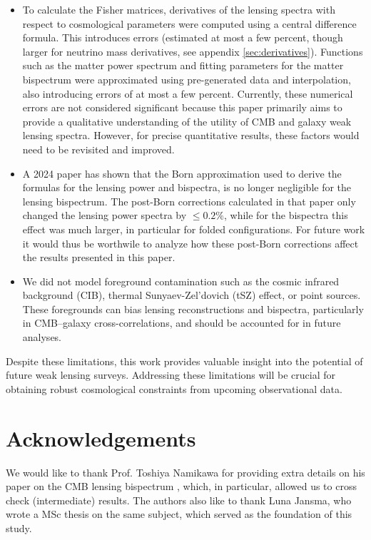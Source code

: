 \documentclass[11pt]{article} %
\begin{document}
\begin{itemize}
    \item To calculate the Fisher matrices, derivatives of the lensing spectra with respect to cosmological parameters were computed using a central difference formula.  This introduces errors (estimated at most a few percent, though larger for neutrino mass derivatives, see appendix \ref{sec:derivatives}). Functions such as the matter power spectrum and fitting parameters for the matter bispectrum were approximated using pre-generated data and interpolation, also introducing errors of at most a few percent. Currently, these numerical errors are not considered significant because this paper primarily aims to provide a qualitative understanding of the utility of CMB and galaxy weak lensing spectra.  However, for precise quantitative results, these factors would need to be revisited and improved.
    
    \item A 2024 paper \cite{postborn_pratten_lewis} has shown that the Born approximation used to derive the formulas for the lensing power and bispectra, is no longer negligible for the lensing bispectrum. The post-Born corrections calculated in that paper only changed the lensing power spectra by $\leq 0.2\%$, while for the bispectra this effect was much larger, in particular for folded configurations. For future work it would thus be worthwile to analyze how these post-Born corrections affect the results presented in this paper.

    \item We did not model foreground contamination such as the cosmic infrared background (CIB), thermal Sunyaev-Zel'dovich (tSZ) effect, or point sources. These foregrounds can bias lensing reconstructions and bispectra, particularly in CMB–galaxy cross-correlations, and should be accounted for in future analyses.
    
\end{itemize}

Despite these limitations, this work provides valuable insight into the potential of future weak lensing surveys. Addressing these limitations will be crucial for obtaining robust cosmological constraints from upcoming observational data.

\section*{Acknowledgements}
We would like to thank Prof. Toshiya Namikawa for providing extra details on his paper on the CMB lensing bispectrum \cite{Namikawa_2016}, which, in particular, allowed us to cross check (intermediate) results. The authors also like to thank Luna Jansma, who wrote a MSc thesis on the same subject, which served as the foundation of this study. 
\end{document}
